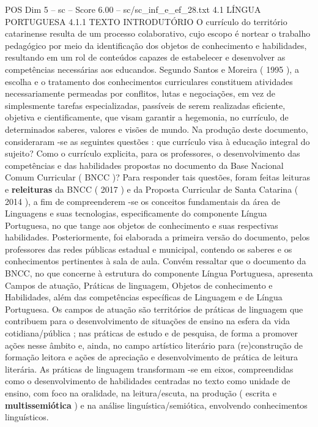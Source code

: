 \begin{textsample}{POS Dim 5 – sc – Score 6.00 – sc/sc\_inf\_e\_ef\_28.txt}  \label{ex:f5_pos_036}
4.1 LÍNGUA PORTUGUESA 4.1.1 TEXTO INTRODUTÓRIO O currículo do território catarinense resulta de um processo colaborativo, cujo escopo é nortear o trabalho pedagógico por meio da identificação dos objetos de conhecimento e habilidades, resultando em um rol de conteúdos capazes de estabelecer e desenvolver as competências necessárias aos educandos.
Segundo Santos e Moreira ( 1995 ), a escolha e o tratamento dos conhecimentos curriculares constituem atividades necessariamente permeadas por conflitos, lutas e negociações, em vez de simplesmente tarefas especializadas, passíveis de serem realizadas eficiente, objetiva e cientificamente, que visam garantir a hegemonia, no currículo, de determinados saberes, valores e visões de mundo.
Na produção deste documento, consideraram -se as seguintes questões : que currículo visa à educação integral do sujeito?
Como o currículo explicita, para os professores, o desenvolvimento das competências e das habilidades propostas no documento da Base Nacional Comum Curricular ( BNCC )?
Para responder tais questões, foram feitas leituras e \textbf{releituras} da BNCC ( 2017 ) e da Proposta Curricular de Santa Catarina ( 2014 ), a fim de compreenderem -se os conceitos fundamentais da área de Linguagens e suas tecnologias, especificamente do componente Língua Portuguesa, no que tange aos objetos de conhecimento e suas respectivas habilidades.
Posteriormente, foi elaborada a primeira versão do documento, pelos professores das redes públicas estadual e municipal, contendo os saberes e os conhecimentos pertinentes à sala de aula.
Convém ressaltar que o documento da BNCC, no que concerne à estrutura do componente Língua Portuguesa, apresenta Campos de atuação, Práticas de linguagem, Objetos de conhecimento e Habilidades, além das competências específicas de Linguagem e de Língua Portuguesa.
Os campos de atuação são territórios de práticas de linguagem que contribuem para o desenvolvimento de situações de ensino na esfera da vida cotidiana/pública ; nas práticas de estudo e de pesquisa, de forma a promover ações nesse âmbito e, ainda, no campo artístico literário para (re)construção de formação leitora e ações de apreciação e desenvolvimento de prática de leitura literária.
As práticas de linguagem transformam -se em eixos, compreendidas como o desenvolvimento de habilidades centradas no texto como unidade de ensino, com foco na oralidade, na leitura/escuta, na produção ( escrita e \textbf{multissemiótica} ) e na análise linguística/semiótica, envolvendo conhecimentos linguísticos.

\end{textsample}

